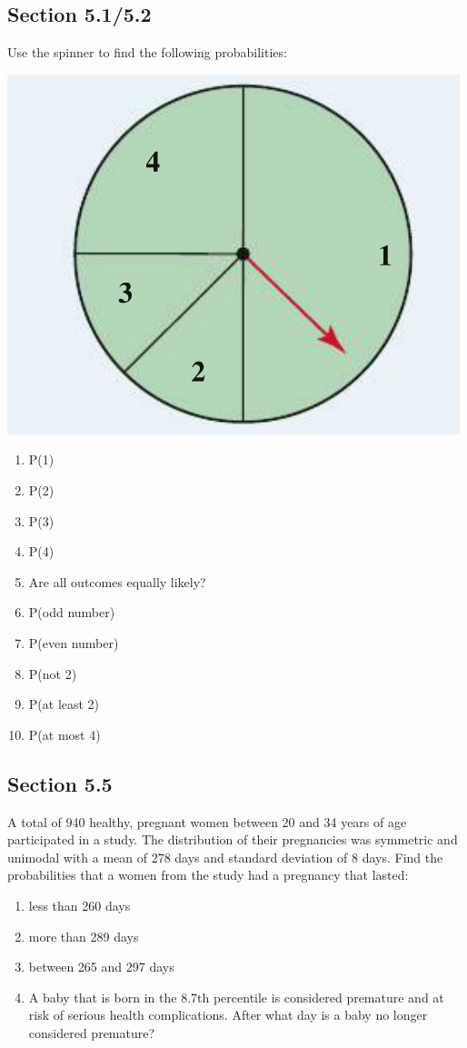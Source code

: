\documentclass[11pt]{scrartcl}
\theoremstyle{definition}
\begin{document}
\subsection*{Section 5.1/5.2}
Use the spinner to find the following probabilities:
\begin{center}
	\includegraphics{Spinner}
\end{center}
\begin{enumerate}
	\item P(1)
	\item P(2)
	\item P(3)
	\item P(4)
	\item Are all outcomes equally likely?
	\item P(odd number)
	\item P(even number)
	\item P(not 2)
	\item P(at least 2)
	\item P(at most 4)
\end{enumerate}

\vspace{1cm}

\subsection*{Section 5.5}
A total of 940 healthy, pregnant women between 20 and 34 years of age participated in a study. The distribution of their pregnancies was symmetric and unimodal with a mean of 278 days and standard deviation of 8 days. Find the probabilities that a women from the study had a pregnancy that lasted:
\begin{enumerate}
	\item less than 260 days
	\item more than 289 days
	\item between 265 and 297 days
	\item A baby that is born in the 8.7th percentile is considered premature and at risk of serious health complications. After what day is a baby no longer considered premature?
\end{enumerate}
\end{document}
